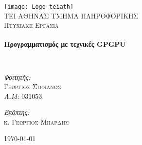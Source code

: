 \begin{titlepage}
\begin{center}

\texttt{[image: Logo\_teiath]}~\\[1cm]

\textsc{\LARGE ΤΕΙ ΑΘΗΝΑΣ ΤΜΗΜΑ ΠΛΗΡΟΦΟΡΙΚΗΣ}\\[1.5cm]

\textsc{\Large Πτυχιακή Εργασία}\\[0.5cm]

\HRule \\[0.4cm]
{ \huge \bfseries Προγραμματισμός με τεχνικές GPGPU \\[0.4cm] }

\HRule \\[1.5cm]

\begin{minipage}{0.4\textwidth}
\begin{flushleft} \large
\emph{Φοιτητής:}\\
\textsc{Γεώργιος Σοφιανός}\\
\emph{A.M:} 031053
\end{flushleft}
\end{minipage}
\begin{minipage}{0.4\textwidth}
\begin{flushright} \large
\emph{Επόπτης:} \\
\textsc{κ. Γεώργιος Μπαρδής}
\end{flushright}
\end{minipage}

\vfill

{\large \today}

\end{center}
\end{titlepage}